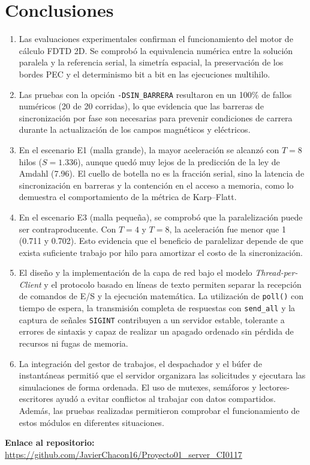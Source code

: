 \documentclass[12pt,a4paper]{article}
\begin{document}
\section{Conclusiones}
\begin{enumerate}
\item Las evaluaciones experimentales confirman el funcionamiento del motor de cálculo FDTD 2D. Se comprobó la equivalencia numérica entre la solución paralela y la referencia serial, la simetría espacial, la preservación de los bordes PEC y el determinismo bit a bit en las ejecuciones multihilo.
\item Las pruebas con la opción \texttt{-DSIN\_BARRERA} resultaron en un 100\% de fallos numéricos (20 de 20 corridas), lo que evidencia que las barreras de sincronización por fase son necesarias para prevenir condiciones de carrera durante la actualización de los campos magnéticos y eléctricos.
\item En el escenario E1 (malla grande), la mayor aceleración se alcanzó con $T=8$ hilos ($S=1.336$), aunque quedó muy lejos de la predicción de la ley de Amdahl (7.96). El cuello de botella no es la fracción serial, sino la latencia de sincronización en barreras y la contención en el acceso a memoria, como lo demuestra el comportamiento de la métrica de Karp--Flatt.
\item En el escenario E3 (malla pequeña), se comprobó que la paralelización puede ser contraproducente. Con $T=4$ y $T=8$, la aceleración fue menor que 1 (0.711 y 0.702). Esto evidencia que el beneficio de paralelizar depende de que exista suficiente trabajo por hilo para amortizar el costo de la sincronización.
\item El diseño y la implementación de la capa de red bajo el modelo \textit{Thread-per-Client} y el protocolo basado en líneas de texto permiten separar la recepción de comandos de E/S y la ejecución matemática. La utilización de \texttt{poll()} con tiempo de espera, la transmisión completa de respuestas con \texttt{send\_all} y la captura de señales \texttt{SIGINT} contribuyen a un servidor estable, tolerante a errores de sintaxis y capaz de realizar un apagado ordenado sin pérdida de recursos ni fugas de memoria.
\item La integración del gestor de trabajos, el despachador y el búfer de instantáneas permitió que el servidor organizara las solicitudes y ejecutara las simulaciones de forma ordenada. El uso de mutexes, semáforos y lectores-escritores ayudó a evitar conflictos al trabajar con datos compartidos. Además, las pruebas realizadas permitieron comprobar el funcionamiento de estos módulos en diferentes situaciones.
\end{enumerate}

\vspace{0.5cm}
\textbf{Enlace al repositorio:} \url{https://github.com/JavierChacon16/Proyecto01_server_CI0117}
\end{document}
